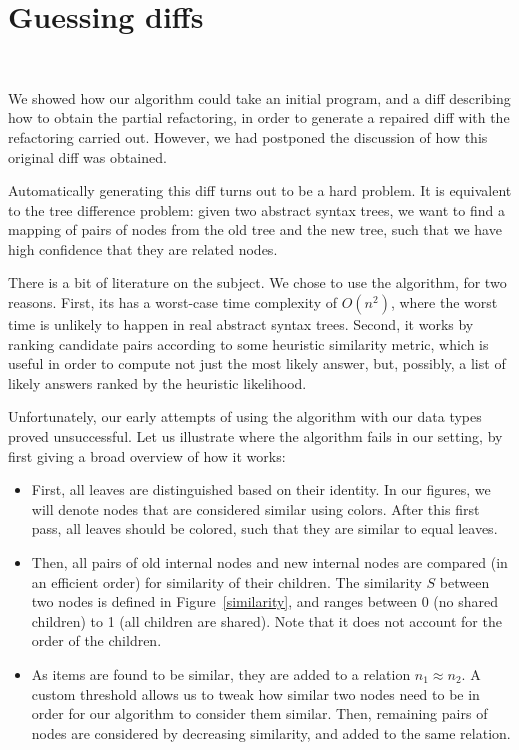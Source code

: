 \section{Guessing diffs}~\label{chick-guess}

We showed how our algorithm could take an initial program, and a diff describing
how to obtain the partial refactoring, in order to generate a repaired diff with
the refactoring carried out.  However, we had postponed the discussion of how
this original diff was obtained.

Automatically generating this diff turns out to be a hard problem.  It is
equivalent to the tree difference problem: given two abstract syntax trees, we
want to find a mapping of pairs of nodes from the old tree and the new tree,
such that we have high confidence that they are related nodes.

There is a bit of literature on the subject.  We chose to use the
 algorithm, for two reasons.  First, its has a worst-case time
complexity of $O(n^{2})$, where the worst time is unlikely to happen in real
abstract syntax trees.  Second, it works by ranking candidate pairs according to
some heuristic similarity metric, which is useful in order to compute not just
the most likely answer, but, possibly, a list of likely answers ranked by the
heuristic likelihood.

Unfortunately, our early attempts of using the algorithm with our data types
proved unsuccessful.  Let us illustrate where the algorithm fails in our
setting, by first giving a broad overview of how it works:

\begin{itemize}

  \item First, all leaves are distinguished based on their identity.  In our
figures, we will denote nodes that are considered similar using colors.  After
this first pass, all leaves should be colored, such that they are similar to
equal leaves.

  \item Then, all pairs of old internal nodes and new internal nodes are
compared (in an efficient order) for similarity of their children.  The
similarity $S$ between two nodes is defined in Figure~\ref{similarity}, and
ranges between 0 (no shared children) to 1 (all children are shared).  Note that
it does not account for the order of the children.

  \item As items are found to be similar, they are added to a relation $n_{1}
\approx n_{2}$.  A custom threshold allows us to tweak how similar two nodes
need to be in order for our algorithm to consider them similar.  Then, remaining
pairs of nodes are considered by decreasing similarity, and added to the same
relation.

\end{itemize}

